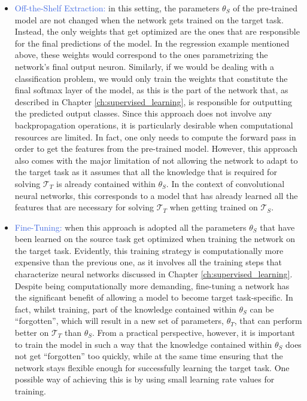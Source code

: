 \begin{itemize}
	\item \textcolor{RoyalBlue}{Off-the-Shelf Extraction:} in this setting, the parameters $\theta_S$ of the pre-trained model are not changed when the network gets trained on the target task. Instead, the only weights that get optimized are the ones that are responsible for the final predictions of the model. In the regression example mentioned above, these weights would correspond to the ones parametrizing the network's final output neuron. Similarly, if we would be dealing with a classification problem, we would only train the weights that constitute the final softmax layer of the model, as this is the part of the network that, as described in Chapter \ref{ch:supervised_learning}, is responsible for outputting the predicted output classes. Since this approach does not involve any backpropagation operations, it is particularly desirable when computational resources are limited. In fact, one only needs to compute the forward pass in order to get the features from the pre-trained model. However, this approach also comes with the major limitation of not allowing the network to adapt to the target task as it assumes that all the knowledge that is required for solving $\mathcal{T}_T$ is already contained within $\theta_S$. In the context of convolutional neural networks, this corresponds to a model that has already learned all the features that are necessary for solving $\mathcal{T}_T$ when getting trained on $\mathcal{T}_S$.   

	\item \textcolor{RoyalBlue}{Fine-Tuning:} when this approach is adopted all the parameters $\theta_S$ that have been learned on the source task get optimized when training the network on the target task. Evidently, this training strategy is computationally more expensive than the previous one, as it involves all the training steps that characterize neural networks discussed in Chapter \ref{ch:supervised_learning}. Despite being computationally more demanding, fine-tuning a network has the significant benefit of allowing a model to become target task-specific. In fact, whilst training, part of the knowledge contained within $\theta_S$ can be ``forgotten'', which will result in a new set of parameters, $\theta_T$, that can perform better on $\mathcal{T}_T$ than $\theta_S$. From a practical perspective, however, it is important to train the model in such a way that the knowledge contained within $\theta_S$ does not get ``forgotten'' too quickly, while at the same time ensuring that the network stays flexible enough for successfully learning the target task. One possible way of achieving this is by using small learning rate values for training.      


\end{itemize}
